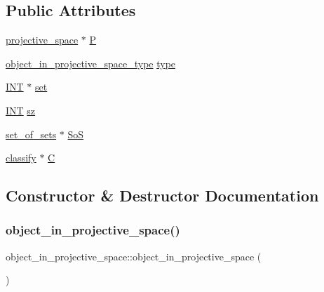 \subsection*{Public Attributes}
\begin{DoxyCompactItemize}
\item 
\mbox{\hyperlink{classprojective__space}{projective\+\_\+space}} $\ast$ \mbox{\hyperlink{classobject__in__projective__space_abd304b597ccddaf6bd78c29dc1ca3da8}{P}}
\item 
\mbox{\hyperlink{galois_8h_a1378bcef7b3c9092ebf659c58bc85f21}{object\+\_\+in\+\_\+projective\+\_\+space\+\_\+type}} \mbox{\hyperlink{classobject__in__projective__space_a665c54b8efc5ff14ef98ed0f1591e060}{type}}
\item 
\mbox{\hyperlink{galois_8h_a09fddde158a3a20bd2dcadb609de11dc}{I\+NT}} $\ast$ \mbox{\hyperlink{classobject__in__projective__space_ac43351246aec961f36322b997be631b2}{set}}
\item 
\mbox{\hyperlink{galois_8h_a09fddde158a3a20bd2dcadb609de11dc}{I\+NT}} \mbox{\hyperlink{classobject__in__projective__space_a2dda692174f30d566b26bf58e62c14cc}{sz}}
\item 
\mbox{\hyperlink{classset__of__sets}{set\+\_\+of\+\_\+sets}} $\ast$ \mbox{\hyperlink{classobject__in__projective__space_a62b975440fff979b15f94dc320cb05f2}{SoS}}
\item 
\mbox{\hyperlink{classclassify}{classify}} $\ast$ \mbox{\hyperlink{classobject__in__projective__space_ad6d759c1d3ce614d8a2555b9173eb892}{C}}
\end{DoxyCompactItemize}


\subsection{Constructor \& Destructor Documentation}
\mbox{\label{classobject__in__projective__space_a57c7803b80a880d6fcbb13dec860702c}} 
\subsubsection{\texorpdfstring{object\+\_\+in\+\_\+projective\+\_\+space()}{object\_in\_projective\_space()}}
{\footnotesize\ttfamily object\+\_\+in\+\_\+projective\+\_\+space\+::object\+\_\+in\+\_\+projective\+\_\+space (\begin{DoxyParamCaption}{ }\end{DoxyParamCaption})}

